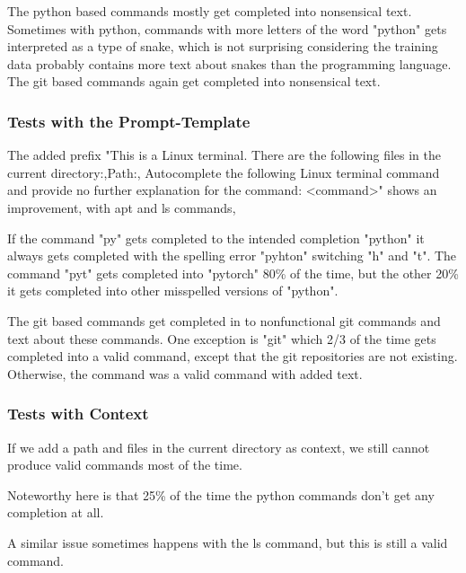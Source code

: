 The python based commands mostly get completed into nonsensical text. Sometimes with python, commands with more letters of the word "python" gets interpreted as a type of snake, which is not surprising considering the training data probably contains more text about snakes than the programming language. The git based commands again get completed into nonsensical text.




\subsubsection{Tests with the Prompt-Template}



The added prefix  "This is a Linux terminal. There are the following files in the current  directory:,Path:, Autocomplete the following Linux terminal command and provide no further explanation for the command: <command>" shows an improvement, with apt and ls commands,


 

If the command "py" gets completed to the intended completion "python" it always gets completed with the spelling error "pyhton" switching "h" and "t". The command "pyt" gets completed into "pytorch" 80\% of the time, but the other 20\% it gets completed into other misspelled versions of "python".


The git based commands get completed in to nonfunctional git commands and text about these commands. One exception is "git" which 2/3 of the time gets completed into a valid command, except that the git repositories are not existing. Otherwise, the command was a valid command  with added text. 




\subsubsection{Tests with Context}



If we add a path and files in the current directory as context, we still cannot produce valid commands most of the time. 



Noteworthy here is that 25\% of the time the python commands don't get any completion at all.



A similar issue sometimes happens with the ls command, but this is still a valid command. 

